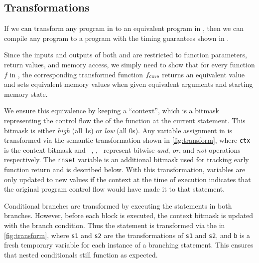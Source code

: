\subsection{Transformations}

If we can transform any program in \constc to an equivalent program in \ccore, then
we can compile any \constc program to a program with the timing guarantees shown in \ccore.

Since the inputs and outputs of both \ccore
and \constc are restricted to function parameters, return values, and memory access,
we simply need to show that for
every function $f$ in \constc, the corresponding transformed function
$f_{\textnormal{core}}$ returns an equivalent value and sets equivalent memory values
when given equivalent arguments and starting memory state.

We ensure this equivalence by keeping a ``context'', which is a bitmask
representing the control flow the of the function at the current statement.
This bitmask is either \emph{high} (all 1s) or \emph{low} (all 0s).
Any variable assignment
in \constc is transformed
via the semantic transformation  shown in \autoref{fig:transform},
where \texttt{ctx} is the context bitmask and ~\band, \bor, \bnot\ represent
bitwise \emph{and}, \emph{or}, and \emph{not} operations respectively.
The \texttt{rnset}
variable is an additional bitmask used for tracking early function return and
is described below.  With this transformation, variables are only updated to
new values if the context at the time of execution indicates that the original
program control flow would have made it to that statement.

Conditional branches are transformed by executing the statements in both
branches. However, before each block is executed, the context bitmask is
updated with the branch condition. Thus the statement
is transformed via the  in \autoref{fig:transform},
where \texttt{\textlangle{}s1\textrangle} and \texttt{\textlangle{}s2\textrangle} are the transformations of \texttt{s1} and \texttt{s2}, and \texttt{b} is a fresh temporary variable for each instance of a branching
statement. This ensures that nested conditionals still function as expected.

